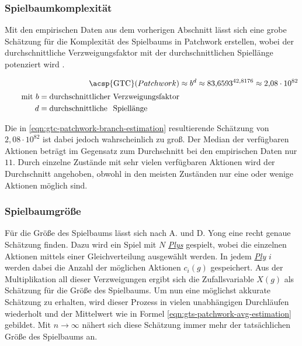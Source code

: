 \subsubsection*{Spielbaumkomplexität}

Mit den empirischen Daten aus dem vorherigen Abschnitt lässt sich eine grobe Schätzung für die Komplexität des Spielbaums in Patchwork erstellen, wobei der durchschnittliche Verzweigungsfaktor mit der durchschnittlichen Spiellänge potenziert wird \cite[S. 160]{1194.SearchAndAiInGames}.

\begin{align}
    \label{eqn:gtc-patchwork-branch-estimation}
    \text{\acsp{GTC}}(Patchwork) & \approx b^d \approx {83{,}6593}^{42{,}8176} \approx 2{,}08 \cdot 10^{82} \\[2pt]
    \tag*{$\text{mit }           b = \text{durchschnittlicher Verzweigungsfaktor}$}                         \\
    \tag*{$\phantom{\text{mit }} d = \text{durchschnittliche\phantom{r} \rlap{Spiellänge}\phantom{Verzweigungsfaktor}}$}
\end{align}

Die in \ref{eqn:gtc-patchwork-branch-estimation} resultierende Schätzung von $2{,}08 \cdot 10^{82}$ ist dabei jedoch wahrscheinlich zu groß. Der Median der verfügbaren Aktionen beträgt im Gegensatz zum Durchschnitt bei den empirischen Daten nur $11$. Durch einzelne Zustände mit sehr vielen verfügbaren Aktionen wird der Durchschnitt angehoben, obwohl in den meisten Zuständen nur eine oder wenige Aktionen möglich sind.

\subsubsection*{Spielbaumgröße}

Für die Größe des Spielbaums lässt sich nach A. und D. Yong eine recht genaue Schätzung finden. Dazu wird ein Spiel mit $N$ \hyperref[text:ply]{\emph{Plys}} gespielt, wobei die einzelnen Aktionen mittels einer Gleichverteilung ausgewählt werden. In jedem \hyperref[text:ply]{\emph{Ply}} $i$ werden dabei die Anzahl der möglichen Aktionen $c_i(g)$ gespeichert. Aus der Multiplikation all dieser Verzweigungen ergibt sich die Zufallsvariable $X(g)$ als Schätzung für die Größe des Spielbaums. Um nun eine möglichst akkurate Schätzung zu erhalten, wird dieser Prozess in vielen unabhängigen Durchläufen wiederholt und der Mittelwert wie in Formel \ref{eqn:gts-patchwork-avg-estimation} gebildet. Mit $n \to \infty$ nähert sich diese Schätzung immer mehr der tatsächlichen Größe des Spielbaums an. \cite{2019.GameTreeComplexityEstimation}

